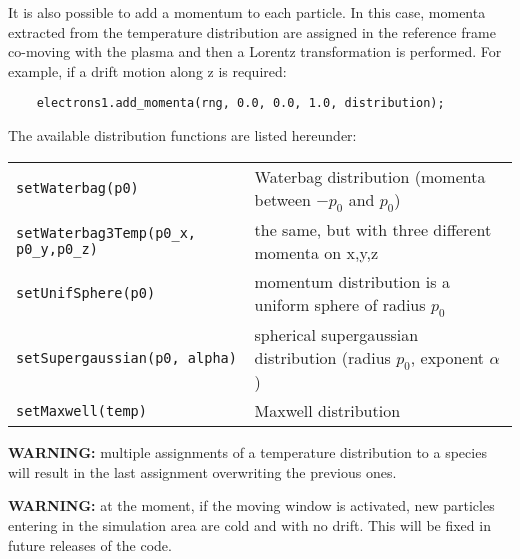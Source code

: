 \documentclass[11pt,a4paper]{report}
\begin{document}
It is also possible to add a momentum to each particle. In this case, momenta extracted from the temperature distribution are assigned in the reference frame co-moving with the plasma and then a Lorentz transformation is performed.   For example, if a drift motion along z is required:
\begin{lstlisting}
	electrons1.add_momenta(rng, 0.0, 0.0, 1.0, distribution);
\end{lstlisting}
The available distribution functions are listed hereunder:
\begin{center}
    \begin{tabular}{ l  l }
    	\verb+setWaterbag(p0)+                    & Waterbag distribution (momenta between $-p_0$ and $p_0$)                \\
    	\verb+setWaterbag3Temp(p0_x, p0_y,p0_z)+  & the same, but with three different momenta on x,y,z                     \\
    	\verb+setUnifSphere(p0)+                  & momentum distribution is a uniform sphere of radius $p_0$               \\
    	\verb+setSupergaussian(p0, alpha)+        & spherical supergaussian distribution (radius $p_0$, exponent $\alpha$)  \\
    	\verb+setMaxwell(temp)+                   & Maxwell distribution                                                    \\
    \end{tabular}
\end{center}
\textbf{WARNING:} multiple assignments of a temperature distribution to a species will result in the last assignment overwriting the previous ones.

\textbf{WARNING:} at the moment, if the moving window is activated, new particles entering in the simulation area are cold and with no drift. This will be fixed in future releases of the code.
\end{document}
